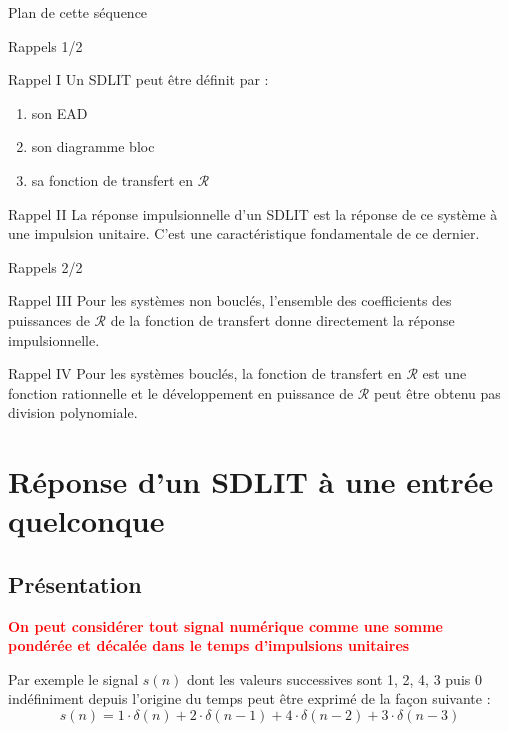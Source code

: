 \documentclass[a4paper,11pt]{beamer}
\begin{document}
\begin{frame}{Plan de cette séquence}
	\tableofcontents[hideallsubsections]
\end{frame}


\begin{frame}{Rappels 1/2}
\begin{alertblock}{Rappel I}
\justifying
Un SDLIT peut être définit par :
\begin{enumerate}
  \item son EAD
  \item son diagramme bloc
  \item sa fonction de transfert en $\mathcal{R}$
\end{enumerate}
\end{alertblock}
\pause
\begin{alertblock}{Rappel II}
\justifying
La réponse impulsionnelle d'un SDLIT est la réponse de ce système à une
impulsion unitaire. C'est une caractéristique fondamentale de ce dernier.
\end{alertblock}
\end{frame}

\begin{frame}{Rappels 2/2}
\begin{alertblock}{Rappel III}
\justifying
Pour les systèmes non bouclés, l'ensemble des coefficients des puissances de
$\mathcal{R}$ de la fonction de transfert donne directement la réponse impulsionnelle.
\end{alertblock}
\pause
\begin{alertblock}{Rappel IV}
\justifying
Pour les systèmes bouclés, la fonction de transfert en $\mathcal{R}$ est une
fonction rationnelle et le développement en puissance de $\mathcal{R}$ peut
être obtenu pas division polynomiale.
\end{alertblock}
\end{frame}

\section[Rép. d'un SDLIT à une entrée quelconque]{Réponse d'un SDLIT à une
entrée quelconque}
\subsection{Présentation}
\begin{frame}
\centering
\textbf{\textcolor{red}{On peut considérer tout signal numérique comme une
somme pondérée et décalée dans le temps d'impulsions unitaires}}
\vspace{1cm}

\justifying
Par exemple le signal $s(n)$ dont les valeurs successives sont 1, 2, 4, 3 puis 0
indéfiniment depuis l'origine du temps peut être exprimé de la façon suivante :
$$
s(n) = 1\cdot \delta(n) + 2\cdot \delta(n-1) + 4\cdot \delta(n-2) + 3\cdot
\delta(n-3)
$$
\end{frame}
\end{document}

